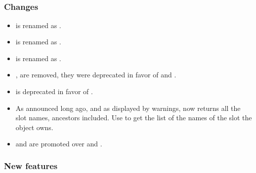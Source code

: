 
\subsection{\us}

\subsubsection{Changes}

\begin{itemize}
\item {} is renamed as .

\item {} is renamed as .

\item {} is renamed as .

\item {},  are removed, they were
  deprecated in favor of  and .

\item {} is deprecated in favor of
  .

\item As announced long ago, and as displayed by warnings,
   now returns all the slot names, ancestors
  included.  Use  to get the list of the
  names of the slot the object owns.

\item {} and  are
  promoted over  and .
\end{itemize}

\subsubsection{New features}

